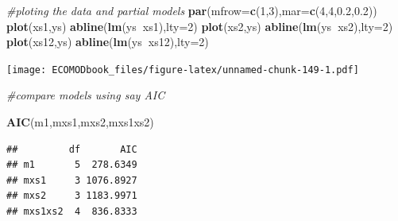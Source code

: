 \documentclass[
]{book}
\newenvironment{Shaded}{\begin{snugshade}}{\end{snugshade}}
\newcommand{\CommentTok}[1]{\textcolor[rgb]{0.56,0.35,0.01}{\textit{#1}}}
\newcommand{\DataTypeTok}[1]{\textcolor[rgb]{0.13,0.29,0.53}{#1}}
\newcommand{\DecValTok}[1]{\textcolor[rgb]{0.00,0.00,0.81}{#1}}
\newcommand{\FloatTok}[1]{\textcolor[rgb]{0.00,0.00,0.81}{#1}}
\newcommand{\KeywordTok}[1]{\textcolor[rgb]{0.13,0.29,0.53}{\textbf{#1}}}
\newcommand{\NormalTok}[1]{#1}
\newcommand{\OperatorTok}[1]{\textcolor[rgb]{0.81,0.36,0.00}{\textbf{#1}}}
\begin{document}
\begin{Shaded}
\begin{Highlighting}[]
\CommentTok{#ploting the data and partial models}
\KeywordTok{par}\NormalTok{(}\DataTypeTok{mfrow=}\KeywordTok{c}\NormalTok{(}\DecValTok{1}\NormalTok{,}\DecValTok{3}\NormalTok{),}\DataTypeTok{mar=}\KeywordTok{c}\NormalTok{(}\DecValTok{4}\NormalTok{,}\DecValTok{4}\NormalTok{,}\FloatTok{0.2}\NormalTok{,}\FloatTok{0.2}\NormalTok{))}
\KeywordTok{plot}\NormalTok{(xs1,ys)}
\KeywordTok{abline}\NormalTok{(}\KeywordTok{lm}\NormalTok{(ys}\OperatorTok{~}\NormalTok{xs1),}\DataTypeTok{lty=}\DecValTok{2}\NormalTok{)}
\KeywordTok{plot}\NormalTok{(xs2,ys)}
\KeywordTok{abline}\NormalTok{(}\KeywordTok{lm}\NormalTok{(ys}\OperatorTok{~}\NormalTok{xs2),}\DataTypeTok{lty=}\DecValTok{2}\NormalTok{)}
\KeywordTok{plot}\NormalTok{(xs12,ys)}
\KeywordTok{abline}\NormalTok{(}\KeywordTok{lm}\NormalTok{(ys}\OperatorTok{~}\NormalTok{xs12),}\DataTypeTok{lty=}\DecValTok{2}\NormalTok{)}
\end{Highlighting}
\end{Shaded}

\texttt{[image: ECOMODbook\_files/figure-latex/unnamed-chunk-149-1.pdf]}

\begin{Shaded}
\begin{Highlighting}[]
\CommentTok{#compare models using say AIC}

\KeywordTok{AIC}\NormalTok{(m1,mxs1,mxs2,mxs1xs2)}
\end{Highlighting}
\end{Shaded}

\begin{verbatim}
##         df       AIC
## m1       5  278.6349
## mxs1     3 1076.8927
## mxs2     3 1183.9971
## mxs1xs2  4  836.8333
\end{verbatim}
\end{document}
